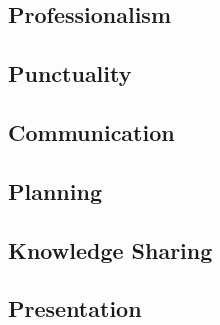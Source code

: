 \subsection{Professionalism}



\subsection{Punctuality}

\subsection{Communication}

\subsection{Planning}

\subsection{Knowledge Sharing}

\subsection{Presentation}

